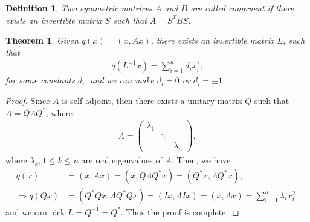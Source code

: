 \documentclass[10pt]{book}
\newtheorem{definition}{Definition}[chapter]
\newtheorem{theorem}{Theorem}[chapter]
\theoremstyle{definition}
\numberwithin{equation}{chapter}
\begin{document}
\medskip

\begin{definition}
Two symmetric matrices $A$ and $B$ are called congruent if there exists an invertible matrix $S$ such that $A = S^T B S$.
\end{definition}

\medskip

\begin{theorem}
Given $q(x) = (x, Ax)$, there exists an invertible matrix $L$, such that
\begin{align*}
    q\left(L^{-1}x\right) = \sum^n_{i=1} d_i x_i^2,
\end{align*}
for some constants $d_i$, and we can make $d_i = 0$ or $d_i = \pm 1$.
\end{theorem}
\begin{proof}
Since $A$ is self-adjoint, then there exists a unitary matrix $Q$ such that $A = Q\Lambda Q^*$, where 
\begin{align*}
    \Lambda = \begin{pmatrix}
    \lambda_1 &  &  \\
     & \ddots  &  \\
     &   & \lambda_n
    \end{pmatrix},
\end{align*}
where $\lambda_k, 1\leq k \leq n$ are real eigenvalues of $A$. Then, we have
\begin{align*}
    q(x) & = (x, Ax) = (x, Q\Lambda Q^* x) = (Q^* x, \Lambda Q^* x), \\
    \Rightarrow q(Qx) & = (Q^* Q x, \Lambda Q^* Q x) = (Ix, \Lambda I x) = (x, \Lambda x) = \sum^n_{i=1} \lambda_i x_i^2,
\end{align*}
and we can pick $L = Q^{-1} = Q^*$. Thus the proof is complete.
\end{proof}

\medskip
\end{document}
